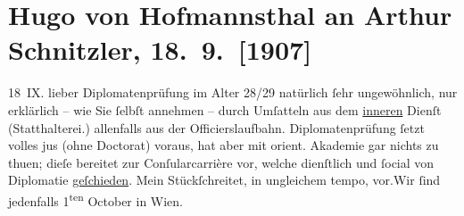 

         
         \newcommand{\erwaehntePersonen}{Personen: Jakob Wassermann}
         \newcommand{\erwaehnteInstitutionen}{Institutionen: Morgen. Wochenschrift für deutsche Kultur, Orientalische Akademie, Über Land und Meer}
         \newcommand{\erwaehnteOrte}{Orte: Bad Aussee, Wien}
         \newcommand{\erwaehnteWerke}{Werke: Caspar Hauser oder Die Trägheit des Herzens, Silvia im »Stern«}
               \section[Hugo von Hofmannsthal an Arthur Schnitzler, 18. 9. {[}1907{]}]{ Hugo von Hofmannsthal an Arthur Schnitzler, 18. 9. {[}1907{]}}\nopagebreak{}\rehead{ }\begin{ledgroupsized}[t]{13cm}\normalsize\beginnumbering \toendnotes[C]{\smallbreak\pagebreak[2]} 
\toendnotes[C]{\smallbreak}\pstart
           \raggedleft{}18 IX.\pend
           \pstart{}{\pb}lieber\pend\pstart
           Diplomatenprüfung im Alter 28/29 natürlich ſehr ungewöhnlich, nur erklärlich – wie
               Sie ſelbſt annehmen – durch Umſatteln aus dem \uline{inneren}
               Dienſt (Statthalterei.) allenfalls aus der Officierslaufbahn. Diplomatenprüfung ſetzt
               volles jus (ohne Doctorat) voraus, hat aber mit orient.
                  Akademie gar nichts zu thuen; dieſe bereitet zur Conſularcarrière {\pb}vor, welche dienſtlich und ſocial
               von Diplomatie \uline{geſchieden}.\pend
           \pstart
           Mein Stückſchreitet, in ungleichem tempo, vor.\hspace*{1.5em}Wir ſind jedenfalls 1\textsuperscript{ten} October in Wien.\pend

\end{ledgroupsized}
